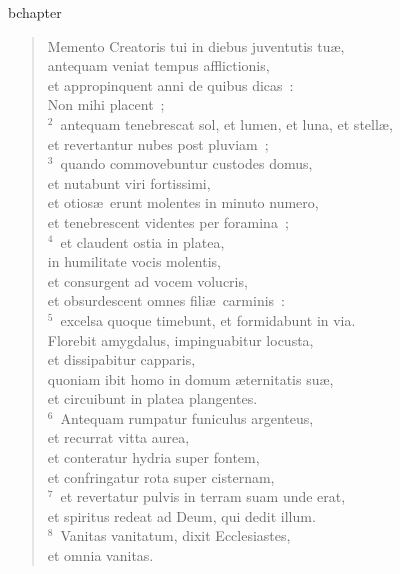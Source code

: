 bchapter\begin{verse}\vspace{-19pt}Memento Creatoris tui in diebus juventutis tu\ae ,\\ antequam veniat tempus afflictionis,\\ et appropinquent anni de quibus dicas~:\\ Non mihi placent~;\\
${}^{2}$~antequam tenebrescat sol, et lumen, et luna, et stell\ae ,\\ et revertantur nubes post pluviam~;\\
${}^{3}$~quando commovebuntur custodes domus,\\ et nutabunt viri fortissimi,\\ et otios\ae\ erunt molentes in minuto numero,\\ et tenebrescent videntes per foramina~;\\
${}^{4}$~et claudent ostia in platea,\\ in humilitate vocis molentis,\\ et consurgent ad vocem volucris,\\ et obsurdescent omnes fili\ae\ carminis~:\\
${}^{5}$~excelsa quoque timebunt, et formidabunt in via.\\ Florebit amygdalus, impinguabitur locusta,\\ et dissipabitur capparis,\\ quoniam ibit homo in domum \ae ternitatis su\ae ,\\ et circuibunt in platea plangentes.\\
${}^{6}$~Antequam rumpatur funiculus argenteus,\\ et recurrat vitta aurea,\\ et conteratur hydria super fontem,\\ et confringatur rota super cisternam,\\
${}^{7}$~et revertatur pulvis in terram suam unde erat,\\ et spiritus redeat ad Deum, qui dedit illum.\\
${}^{8}$~Vanitas vanitatum, dixit Ecclesiastes,\\ et omnia vanitas.\end{verse}


